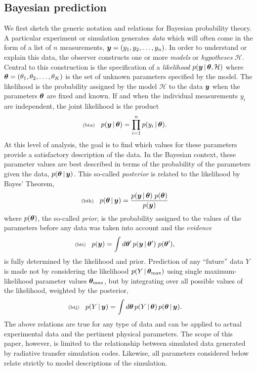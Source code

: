 \documentclass[11pt]{article}
\newcommand{\lleq}[1]{\label{#1} }
\renewcommand{\lleq}[1]{\label{#1} {\scriptstyle {\rm (#1)}} \hspace*{2ex} }
\newcommand{\hypo}  {{\mathcal{H}}}  %
\newcommand{\cond}{\,|\,}
\begin{document}
\subsection{Bayesian prediction}
\label{sec:bayp}

We first sketch the generic notation and relations for Bayesian
probability theory.
%
A particular experiment or simulation generates
\textit{data}
which will often come in the form of a list of $n$ measurements,
${\bm{y}} = (y_1,y_2,\ldots,y_n)$. In order to understand or explain this
data, the observer constructs one or more \textit{models} or
\textit{hypotheses} $\hypo$. Central to this construction is the
specification of a \textit{likelihood} $p(\bmy\cond \bmtheta,\hypo)$
where ${\bm{\theta}} = (\theta_1,\theta_2,\ldots,\theta_K)$ is the set of
unknown parameters specified by the model. The likelihood is the
probability assigned by the model $\hypo$ to the data ${\bm{y}}$ when the
parameters ${\bm{\theta}}$ are fixed and known.
%
If and when the individual measurements $y_i$ are independent, the
joint likelihood is the product
\begin{align}
  \lleq{bta}
  p(\bmy\cond \bmtheta) &= \prod_{i=1}^n p(y_i\cond \bmtheta).
\end{align}
At this level of analysis, the goal is to find which values for these
parameters provide a satisfactory description of the data. In the
Bayesian context, these parameter values are best described in terms
of the probability of the parameters given the data,
$p(\bmtheta\cond \bmy)$. This so-called \textit{posterior} is related
to the likelihood by Bayes' Theorem,
\begin{align}
  \lleq{bth}
  p(\bmtheta\cond \bmy)
  &= \frac{p(\bmy\cond\bmtheta)\;p(\bmtheta)}
    {p(\bmy)}
\end{align}
where $p({\bm{\theta}})$, the so-called \textit{prior}, is the probability
assigned to the values of the parameters before any data was taken
into account and the \textit{evidence}
\begin{align}
  \lleq{bti}
  p(\bmy) &= \int d\bmtheta'\, p(\bmy\cond\bmtheta')\;p(\bmtheta'),
\end{align}
is fully determined by the likelihood and prior.
%
Prediction of any ``future'' data $Y$ is made not by considering the
likelihood $p(Y\cond\bmtheta_{\rm max})$ using single
maximum-likelihood parameter values ${\bm{\theta}}_{\rm max}$, but by
integrating over all possible values of the likelihood, weighted by
the posterior,
\begin{align}
  \lleq{btj}
  p(Y\cond \bmy) &= \int d\bmtheta\,p(Y\cond\bmtheta)\,p(\bmtheta\cond \bmy).
\end{align}
The above relations are true for any type of data and can be applied
to actual experimental data and the pertinent physical parameters. The
scope of this paper, however, is limited to the relationship between
simulated data generated by radiative transfer simulation codes.
Likewise, all parameters considered below relate strictly to model
descriptions of the simulation.
\end{document}
